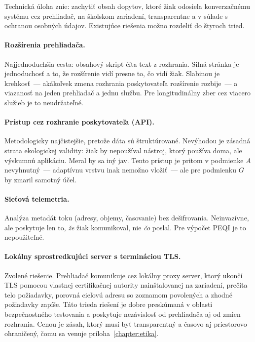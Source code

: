 Technická úloha znie: zachytiť obsah dopytov, ktoré žiak odosiela konverzačnému systému cez prehliadač, na školskom zariadení, transparentne a v súlade s ochranou osobných údajov. Existujúce riešenia možno rozdeliť do štyroch tried.

\paragraph{Rozšírenia prehliadača.} Najjednoduchšia cesta: obsahový skript číta text z rozhrania. Silná stránka je jednoduchosť a to, že rozšírenie vidí presne to, čo vidí žiak. Slabinou je krehkosť~--- akákoľvek zmena rozhrania poskytovateľa rozšírenie rozbije~--- a viazanosť na jeden prehliadač a jednu službu. Pre longitudinálny zber cez viacero služieb je to neudržateľné.

\paragraph{Prístup cez rozhranie poskytovateľa (API).} Metodologicky najčistejšie, pretože dáta sú štruktúrované. Nevýhodou je zásadná strata ekologickej validity: žiak by nepoužíval nástroj, ktorý používa doma, ale výskumnú aplikáciu. Meral by sa iný jav. Tento prístup je pritom v podmienke $A$ nevyhnutný~--- adaptívnu vrstvu inak nemožno vložiť~--- ale pre podmienku $G$ by zmaril samotný účel.

\paragraph{Sieťová telemetria.} Analýza metadát toku (adresy, objemy, časovanie) bez dešifrovania. Neinvazívne, ale poskytuje len to, \emph{že} žiak komunikoval, nie \emph{čo} poslal. Pre výpočet PEQI je to nepoužiteľné.

\paragraph{Lokálny sprostredkujúci server s termináciou TLS.} Zvolené riešenie. Prehliadač komunikuje cez lokálny proxy server, ktorý ukončí TLS pomocou vlastnej certifikačnej autority nainštalovanej na zariadení, prečíta telo požiadavky, porovná cieľovú adresu so zoznamom povolených a zhodné požiadavky zapíše. Táto trieda riešení je dobre preskúmaná v oblasti bezpečnostného testovania a poskytuje nezávislosť od prehliadača aj od zmien rozhrania. Cenou je zásah, ktorý musí byť transparentný a časovo aj priestorovo ohraničený, čomu sa venuje príloha~\ref{chapter:etika}.

